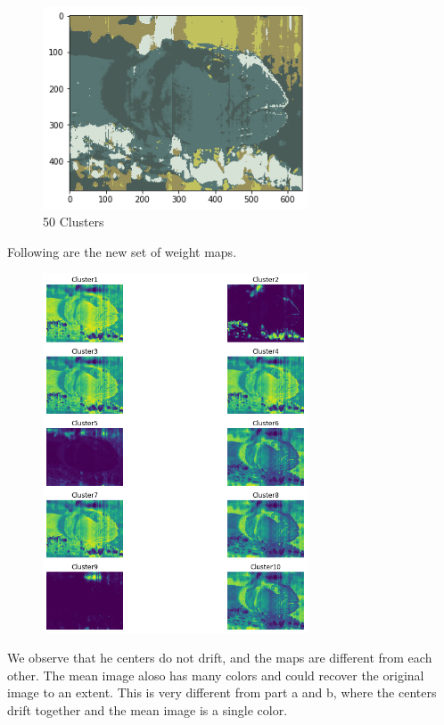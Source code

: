 \documentclass{article}      %
\begin{document}
    
\begin{figure}[H]
\centering
\includegraphics[width=0.7\textwidth]{fish_partd_means_50}
\caption{50 Clusters}
\end{figure}

Following are the new set of weight maps.

\begin{figure}[H]
\centering
\includegraphics[width=0.7\textwidth]{fish_wts_partd}
\caption{}
\end{figure}

We observe that he centers do not drift, and the maps are different from each other. The mean image aloso has many colors and could recover the original image to an extent. This is very different from part a and b, where the centers drift together and the mean image is a single color.
\end{document}
